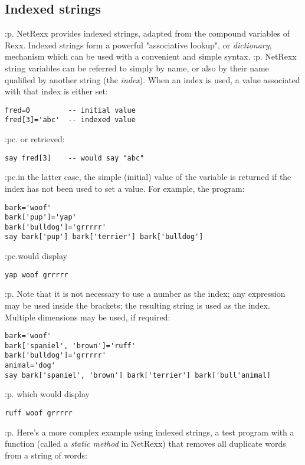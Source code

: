 \subsection{Indexed strings}\label{refoindex}
:p.
NetRexx provides indexed strings, adapted from the compound variables of
Rexx.  Indexed strings form a powerful "associative lookup",
or \emph{dictionary}, mechanism which can be used with a
convenient and simple syntax.
:p.
NetRexx string variables can be referred to simply by name, or also by
their name qualified by another string (the \emph{index}).  When an
index is used, a value associated with that index is either set:
\begin{verbatim}
fred=0         -- initial value
fred[3]='abc'  -- indexed value
\end{verbatim}
:pc.
or retrieved:
\begin{verbatim}
say fred[3]    -- would say "abc"
\end{verbatim}
:pc.in the latter case, the simple (initial) value of the variable is
returned if the index has not been used to set a value.  For example,
the program:
\begin{verbatim}
bark='woof'
bark['pup']='yap'
bark['bulldog']='grrrrr'
say bark['pup'] bark['terrier'] bark['bulldog']
\end{verbatim}
:pc.would display
\begin{verbatim}
yap woof grrrrr
\end{verbatim}
:p.
Note that it is not necessary to use a number as the index; any
expression may be used inside the brackets; the resulting string is
used as the index.  Multiple dimensions may be used, if required:
\begin{verbatim}
bark='woof'
bark['spaniel', 'brown']='ruff'
bark['bulldog']='grrrrr'
animal='dog'
say bark['spaniel', 'brown'] bark['terrier'] bark['bull'animal]
\end{verbatim}
:p.
which would display
\begin{verbatim}
ruff woof grrrrr
\end{verbatim}
:p.
Here's a more complex example using indexed strings, a test program with
a function (called a \emph{static method} in NetRexx) that removes
all duplicate words from a string of words:
